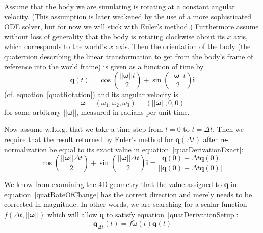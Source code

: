 Assume that the body we are simulating is rotating at a constant angular velocity.
(This assumption is later weakened by the use of a more sophisticated ODE solver,
but for now we will stick with Euler's method.) Furthermore assume without loss of
generality that the body is rotating clockwise about its $x$ axis, which corresponds
to the world's $x$ axis. Then the orientation of the body (the quaternion describing
the linear transformation to get from the body's frame of reference into the world
frame) is given as a function of time by
\begin{equation}
\label{quatDerivationExact}
\mathbf{q}(t) = \cos\left(\frac{||\bm{\omega}||t}{2}\right) +
    \sin\left(\frac{||\bm{\omega}||t}{2}\right)\mathbf{i}
\end{equation}
(cf. equation~\ref{quatRotation}) and its angular velocity is
\begin{equation}
\bm{\omega} = (\omega_1, \omega_2, \omega_3) = (||\bm{\omega}||, 0, 0)
\end{equation}
for some arbitrary $||\bm{\omega}||$, measured in radians per unit time.

Now assume w.l.o.g. that we take a time step from $t = 0$ to $t = \Delta t$.
Then we require that the result returned by Euler's method for $\mathbf{q}(\Delta t)$
after re-normalization be equal to its exact value in equation~\ref{quatDerivationExact}:
\begin{equation}
\label{quatDerivationSetup}
\cos\left(\frac{||\bm{\omega}||\Delta t}{2}\right) +
    \sin\left(\frac{||\bm{\omega}||\Delta t}{2}\right)\mathbf{i} =
    \frac{\mathbf{q}(0) + \Delta t \dot{\mathbf{q}}(0)}
        {||\mathbf{q}(0) + \Delta t \dot{\mathbf{q}}(0)||}
\end{equation}

We know from examining the 4D geometry that the value assigned to $\dot{\mathbf{q}}$
in equation~\ref{quatRateOfChange} has the correct direction and merely needs to be
corrected in magnitude. In other words, we are searching for a scalar function
$f(\Delta t, ||\bm{\omega}||)$ which will allow $\dot{\mathbf{q}}$ to satisfy
equation~\ref{quatDerivationSetup}:
\begin{equation}
\dot{\mathbf{q}}_{\Delta t}(t) = f\tilde{\bm{\omega}}(t)\mathbf{q}(t)
\end{equation}

